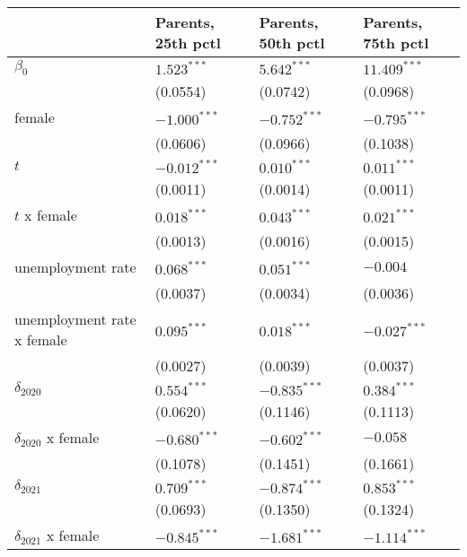 \begin{tabular}{llll}
\toprule
{} & Parents, 25th pctl & Parents, 50th pctl & Parents, 75th pctl \\
\midrule
$\beta_0$                  &      $1.523^{***}$ &      $5.642^{***}$ &     $11.409^{***}$ \\
                           &           (0.0554) &           (0.0742) &           (0.0968) \\
female                     &     $-1.000^{***}$ &     $-0.752^{***}$ &     $-0.795^{***}$ \\
                           &           (0.0606) &           (0.0966) &           (0.1038) \\
$t$                        &     $-0.012^{***}$ &      $0.010^{***}$ &      $0.011^{***}$ \\
                           &           (0.0011) &           (0.0014) &           (0.0011) \\
$t$ x female               &      $0.018^{***}$ &      $0.043^{***}$ &      $0.021^{***}$ \\
                           &           (0.0013) &           (0.0016) &           (0.0015) \\
unemployment rate          &      $0.068^{***}$ &      $0.051^{***}$ &           $-0.004$ \\
                           &           (0.0037) &           (0.0034) &           (0.0036) \\
unemployment rate x female &      $0.095^{***}$ &      $0.018^{***}$ &     $-0.027^{***}$ \\
                           &           (0.0027) &           (0.0039) &           (0.0037) \\
$\delta_{2020}$            &      $0.554^{***}$ &     $-0.835^{***}$ &      $0.384^{***}$ \\
                           &           (0.0620) &           (0.1146) &           (0.1113) \\
$\delta_{2020}$ x female   &     $-0.680^{***}$ &     $-0.602^{***}$ &           $-0.058$ \\
                           &           (0.1078) &           (0.1451) &           (0.1661) \\
$\delta_{2021}$            &      $0.709^{***}$ &     $-0.874^{***}$ &      $0.853^{***}$ \\
                           &           (0.0693) &           (0.1350) &           (0.1324) \\
$\delta_{2021}$ x female   &     $-0.845^{***}$ &     $-1.681^{***}$ &     $-1.114^{***}$ \\

\end{tabular}
